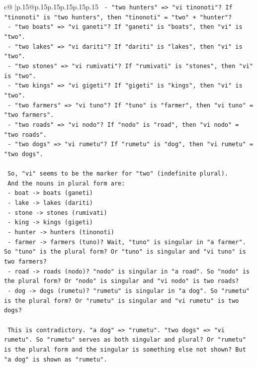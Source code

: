 \documentclass{article}
\begin{document}
{\begin{supertabular}{c@{$\;$}|p{.15\linewidth}@{}p{.15\linewidth}p{.15\linewidth}p{.15\linewidth}p{.15\linewidth}p{.15\linewidth}}
{{{\texttt{   {-} "two hunters" => "vi tinonoti"? If "tinonoti" is "two hunters", then "tinonoti" = "two" + "hunter"?} \\
\texttt{   {-} "two boats" => "vi ganeti"? If "ganeti" is "boats", then "vi" is "two".} \\
\texttt{   {-} "two lakes" => "vi dariti"? If "dariti" is "lakes", then "vi" is "two".} \\
\texttt{   {-} "two stones" => "vi rumivati"? If "rumivati" is "stones", then "vi" is "two".} \\
\texttt{   {-} "two kings" => "vi gigeti"? If "gigeti" is "kings", then "vi" is "two".} \\
\texttt{   {-} "two farmers" => "vi tuno"? If "tuno" is "farmer", then "vi tuno" = "two farmers".} \\
\texttt{   {-} "two roads" => "vi nodo"? If "nodo" is "road", then "vi nodo" = "two roads".} \\
\texttt{   {-} "two dogs" => "vi rumetu"? If "rumetu" is "dog", then "vi rumetu" = "two dogs".} \\
\\ 
\texttt{   So, "vi" seems to be the marker for "two" (indefinite plural).} \\
\texttt{   And the nouns in plural form are:} \\
\texttt{   {-} boat {-}> boats (ganeti)} \\
\texttt{   {-} lake {-}> lakes (dariti)} \\
\texttt{   {-} stone {-}> stones (rumivati)} \\
\texttt{   {-} king {-}> kings (gigeti)} \\
\texttt{   {-} hunter {-}> hunters (tinonoti)} \\
\texttt{   {-} farmer {-}> farmers (tuno)? Wait, "tuno" is singular in "a farmer". So "tuno" is the plural form? Or "tuno" is singular and "vi tuno" is two farmers?} \\
\texttt{   {-} road {-}> roads (nodo)? "nodo" is singular in "a road". So "nodo" is the plural form? Or "nodo" is singular and "vi nodo" is two roads?} \\
\texttt{   {-} dog {-}> dogs (rumetu)? "rumetu" is singular in "a dog". So "rumetu" is the plural form? Or "rumetu" is singular and "vi rumetu" is two dogs?} \\
\\ 
\texttt{   This is contradictory. "a dog" => "rumetu". "two dogs" => "vi rumetu". So "rumetu" serves as both singular and plural? Or "rumetu" is the plural form and the singular is something else not shown? But "a dog" is shown as "rumetu".} \\
}}}
\end{supertabular}}
\end{document}
